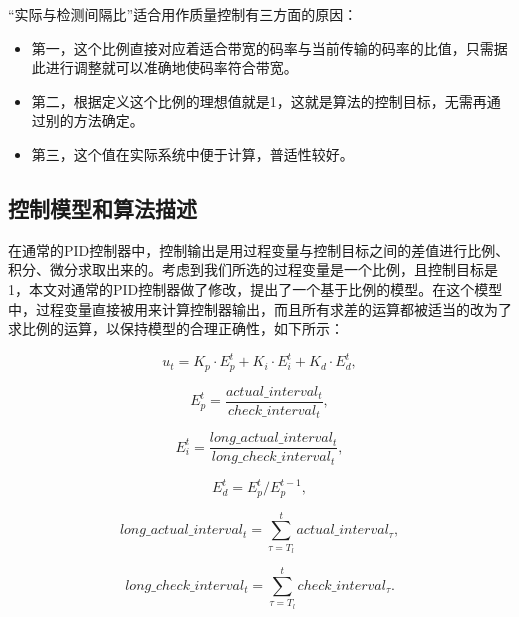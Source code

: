 “实际与检测间隔比”适合用作质量控制有三方面的原因：
\begin{itemize}
	\item 第一，这个比例直接对应着适合带宽的码率与当前传输的码率的比值，只需据此进行调整就可以准确地使码率符合带宽。
	\item 第二，根据定义这个比例的理想值就是1，这就是算法的控制目标，无需再通过别的方法确定。
	\item 第三，这个值在实际系统中便于计算，普适性较好。
\end{itemize}

\subsection{控制模型和算法描述}

在通常的PID控制器中，控制输出是用过程变量与控制目标之间的差值进行比例、积分、微分求取出来的。考虑到我们所选的过程变量是一个比例，且控制目标是1，本文对通常的PID控制器做了修改，提出了一个基于比例的模型。在这个模型中，过程变量直接被用来计算控制器输出，而且所有求差的运算都被适当的改为了求比例的运算，以保持模型的合理正确性，如下所示：

\begin{equation}
\label{eq:ut}
{u_t} = {K_p} \cdot E_p^t + {K_i} \cdot E_i^t + {K_d} \cdot E_d^t ,
\end{equation}

\begin{equation}
\label{eq:ep}
E_p^t = \frac{{actual\_interva{l_t}}}{{check\_interva{l_t}}} ,
\end{equation}

\begin{equation}
\label{eq:ei}
E_i^t = \frac{{long\_actual\_interva{l_t}}}{{long\_check\_interva{l_t}}} ,
\end{equation}

\begin{equation}
\label{eq:ed}
E_d^t = E_p^t/E_p^{t - 1} ,
\end{equation}

\begin{equation}
\label{eq:long-actual}
long\_actual\_interva{l_t} = \sum\limits_{\tau = {T_l}}^t {actual\_interva{l_\tau}} ,
\end{equation}

\begin{equation}
\label{eq:long-check}
long\_check\_interva{l_t} = \sum\limits_{\tau = {T_l}}^t {check\_interva{l_\tau}} .
\end{equation}


